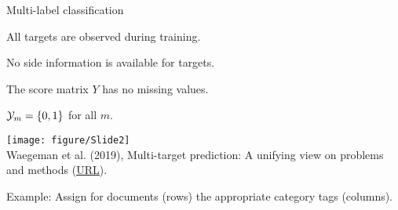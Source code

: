 \documentclass[11pt,compress,t,notes=noshow, xcolor=table]{beamer}
\begin{document}
\begin{frame}{Multi-label classification}
	\begin{itemize}

        \begin{minipage}{0.45\textwidth}  
            \item All targets are observed during training.
            
            \item No side information is available for targets. 

			\item The score matrix $Y$ has no missing values. 	

			\item $\mathcal{Y}_m = \{0,1\}$ for all $m$.	
		\end{minipage}
        \hfill
		\begin{minipage}{0.45\textwidth}    
		\begin{center}
			\texttt{[image: figure/Slide2]} \tiny
			\\ Waegeman et al. (2019), Multi-target prediction:
			A unifying view on problems and methods (\href{https://arxiv.org/pdf/1809.02352.pdf}{\underline{URL}}).
		\end{center}
		\end{minipage}
	\end{itemize}	

	Example: Assign for documents (rows) the appropriate category tags (columns).

\end{frame}
\end{document}
